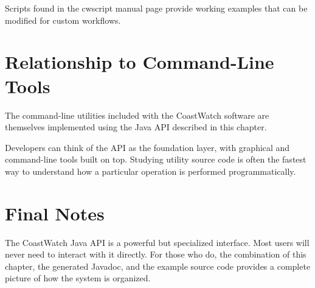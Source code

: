 Scripts found in the cwscript manual page provide working examples that can
be modified for custom workflows.

\section{Relationship to Command-Line Tools}

The command-line utilities included with the CoastWatch software are
themselves implemented using the Java API described in this chapter.

Developers can think of the API as the foundation layer, with graphical
and command-line tools built on top. Studying utility source code is
often the fastest way to understand how a particular operation is
performed programmatically.

\section*{Final Notes}

The CoastWatch Java API is a powerful but specialized interface. Most
users will never need to interact with it directly. For those who do,
the combination of this chapter, the generated Javadoc, and the example
source code provides a complete picture of how the system is organized.
